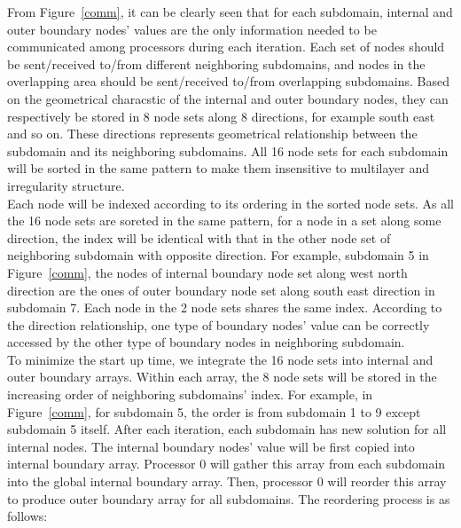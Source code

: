 \documentclass{sig-alternate}
\begin{document}
	From Figure~\ref{comm}, it can be clearly seen that for each subdomain, internal and outer boundary nodes' values 
	are the only information needed to be communicated among processors during each iteration. Each set of nodes should be 
	sent/received to/from different neighboring subdomains, and nodes in the overlapping area should be sent/received to/from  
	overlapping subdomains. Based on the geometrical characstic of the internal and outer boundary nodes, they can respectively 
	be stored in 8 node sets along 8 directions, for example south east and so on. These directions represents geometrical 
	relationship between the subdomain and its neighboring subdomains. All 16 node sets for each subdomain will be sorted in the 
	same pattern to make them insensitive to multilayer and irregularity structure.\\ 

	Each node will be
	indexed according to its ordering in the sorted node sets. As all the 16 node sets are soreted in the same pattern, for a node in
	a set along some direction, the index will be identical with that in the other node set of neighboring subdomain with opposite
	direction. For example, subdomain 5 in Figure~\ref{comm}, the nodes of internal boundary node set along west north 
	direction are the ones of outer boundary node set along south east direction in subdomain 7. Each node in the 2 node sets 
	shares the same index. According to the direction relationship, one type of boundary nodes' value can be correctly accessed by 
	the other type of boundary nodes in neighboring subdomain.\\

	To minimize the start up time, we integrate the 16 node sets into internal and outer boundary arrays. 
	Within each array, the 8 node sets will be stored in the increasing order of neighboring subdomains' index. 
	For example, in Figure~\ref{comm}, for subdomain 5, the order is from subdomain 1 to 9 
	except subdomain 5 itself. After each iteration, each subdomain has new solution for all internal nodes. The internal 
	boundary nodes' value will be first copied into internal boundary array. Processor 0 will gather this array from each subdomain
	into the global internal boundary array. Then, processor 0 will reorder this array to produce outer boundary array 
	for all subdomains. The reordering process is as follows: \\
\end{document}
